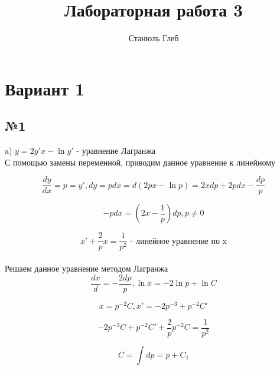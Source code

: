 \documentclass{article}
\title{Лабораторная работа 3}
\author{Станюль Глеб}
\begin{document}
\maketitle

\section*{Вариант 1}
\subsection*{№1}
a)  $y = 2y'x - \ln{y'} \text{  - уравнение Лагранжа}$\\
С помощью замены переменной, приводим данное уравнение к линейному

\begin{equation*}
    \frac{dy}{dx} = p = y', dy = pdx = d (2px - \ln{p}) = 2xdp + 2pdx - \frac{dp}{p}
\end{equation*}

\begin{equation*}
    -pdx = (2x - \frac{1}{p})dp , p \ne 0
\end{equation*}

\begin{equation*}
    x' + \frac{2}{p}x = \frac{1}{p^2} \text{ - линейное уравнение по x}
\end{equation*}
\\Решаем данное уравнение методом Лагранжа
\begin{equation*}
     \frac{dx}{d} = - \frac{2dp}{p}, \ln{x} = -2\ln{p} + \ln{C}
\end{equation*}

\begin{equation*}
    x = p^{-2}C, x' = -2p^{-3} + p^{-2}C'
\end{equation*}

\begin{equation*}
    -2p^{-3}C + p^{-2}C' + \frac{2}{p}p^{-2}C = \frac{1}{p^2}
\end{equation*}

\begin{equation*}
    C = \int{dp} = p + C_1
\end{equation*}
\end{document}
